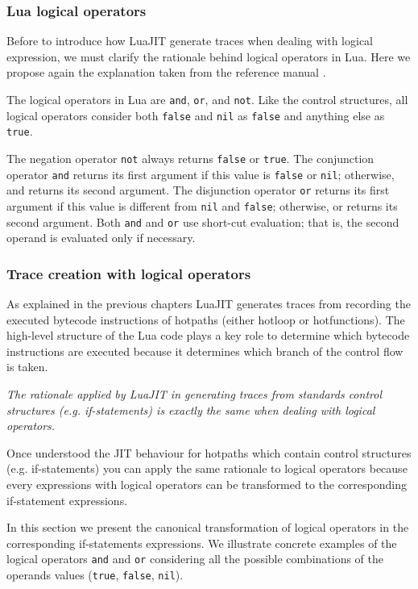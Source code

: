 \subsubsection{Lua logical operators}
Before to introduce how LuaJIT generate traces when dealing with logical expression, we must clarify the rationale behind logical operators in Lua. Here we propose again the explanation taken from the reference manual \cite{lua-ref-man}.

The logical operators in Lua are \texttt{and}, \texttt{or}, and \texttt{not}. Like the control structures, all logical operators consider both \texttt{false} and \texttt{nil} as \texttt{false} and anything else as \texttt{true}. 

The negation operator \texttt{not} always returns \texttt{false} or \texttt{true}. The conjunction operator \texttt{and} returns its first argument if this value is \texttt{false} or \texttt{nil}; otherwise, and returns its second argument. The disjunction operator \texttt{or} returns its first argument if this value is different from \texttt{nil} and \texttt{false}; otherwise, or returns its second argument. Both \texttt{and} and \texttt{or} use short-cut evaluation; that is, the second operand is evaluated only if necessary.

\subsubsection{Trace creation with logical operators}
As explained in the previous chapters LuaJIT generates traces from recording the executed bytecode instructions of hotpaths (either hotloop or hotfunctions). The high-level structure of the Lua code plays a key role to determine which bytecode instructions are executed because it determines which branch of the control flow is taken. 

\begin{center}
    {\textit{The rationale applied by LuaJIT in generating traces from standards control structures (e.g. if-statements) is exactly the same when dealing with logical operators.}}
\end{center}

\noindent
Once understood the JIT behaviour for hotpaths which contain control structures (e.g. if-statements) you can apply the same rationale to logical operators because every expressions with logical operators can be transformed to the corresponding if-statement expressions.

In this section we present the canonical transformation of logical operators in the corresponding if-statements expressions. We illustrate concrete examples of the logical operators \texttt{and} and \texttt{or} considering all the possible combinations of the operands values (\texttt{true}, \texttt{false}, \texttt{nil}).



